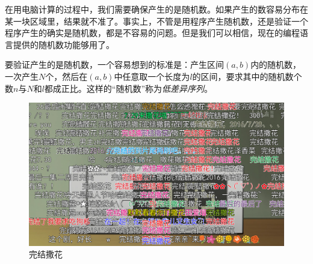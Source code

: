 在用电脑计算的过程中，我们需要确保产生的是随机数。如果产生的数容易分布在某一块区域里，结果就不准了。事实上，不管是用程序产生随机数，还是验证一个程序产生的确实是随机数，都是不容易的问题。但是我们可以相信，现在的编程语言提供的随机数功能够用了。

要验证产生的是随机数，一个容易想到的标准是：产生区间$(a,b)$内的随机数，一次产生$N$个，然后在$(a,b)$中任意取一个长度为$l$的区间，要求其中的随机数个数$n$与$N$和$l$都成正比。这样的“随机数”称为\emph{低差异序列}。
\vfill
\begin{figure}[htb]
\centering
\includegraphics[width=\textwidth]{fig/final-flower.png}
\caption{完结撒花}
\label{fig-final-flower}
\end{figure}
\vfill
